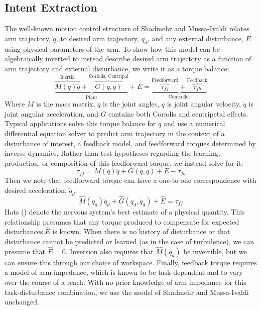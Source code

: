 \documentclass[letterpaper, 10 pt, conference]{ieeeconf}  %
\begin{document}
\subsection{Intent Extraction}
The well-known motion control structure of Shadmehr and Mussa-Ivaldi\cite{shadmehr1994adaptive} relates arm trajectory, $q$, to desired arm trajectory, $q_d$, and any external disturbance, $E$ using physical parameters of the arm. To show how this model can be algebraically inverted to instead describe desired arm trajectory as a function of arm trajectory and external disturbance, we write it as a torque balance:
\begin{equation}
\underbrace{\overbrace{M(q)\ddot{q}}^{\text{Inertia}}+\overbrace{G(q,\dot{q})}^{\text{Coriolis, Centripal}}}_{\text{Plant}}+E=
\underbrace{\overbrace{\tau_{ff}}^{\text{Feedforward}}+\overbrace{\tau_{fb}}^{\text{Feedback}}}_\text{Controller}
\end{equation}
Where $M$ is the mass matrix, $q$ is the joint angles, $\dot{q}$ is joint angular velocity, $\ddot{q}$ is joint angular acceleration, and $G$ contains both Coriolis and centripetal effects. Typical applications solve this torque balance for $\ddot{q}$ and use a numerical differential equation solver to predict arm trajectory in the context of a disturbance of interest, a feedback model, and feedforward torques determined by inverse dynamics. Rather than test hypotheses regarding the learning, production, or composition of this feedforward torque, we instead solve for it:
\begin{equation}
\tau_{ff}=M(q)\ddot{q}+G(q,\dot{q})+E-\tau_{fb}
\end{equation}
Then we note that feedforward torque can have a one-to-one correspondence with desired acceleration, $\ddot{q}_d$:
\begin{equation}
\hat{M}(q_d)\ddot{q}_d+\hat{G}(q_d,\dot{q}_d)+\hat{E}=\tau_{ff}
\end{equation}
Hats ($\hat{}$) denote the nervous system's best estimate of a physical quantity. This relationship presumes that any torque produced to compensate for expected disturbances,$\hat{E}$ is known. When there is no history of disturbance or that disturbance cannot be predicted or learned (as in the case of turbulence), we can presume that $\hat{E}=0$. Inversion also requires that $\hat{M}(q_d)$ be invertible, but we can ensure this through our choice of workspace. Finally, feedback torque requires a model of arm impedance, which is known to be task-dependent and to vary over the course of a reach. With no prior knowledge of arm impedance for this task-disturbance combination, we use the model of Shadmehr and Mussa-Ivaldi unchanged.
\end{document}
